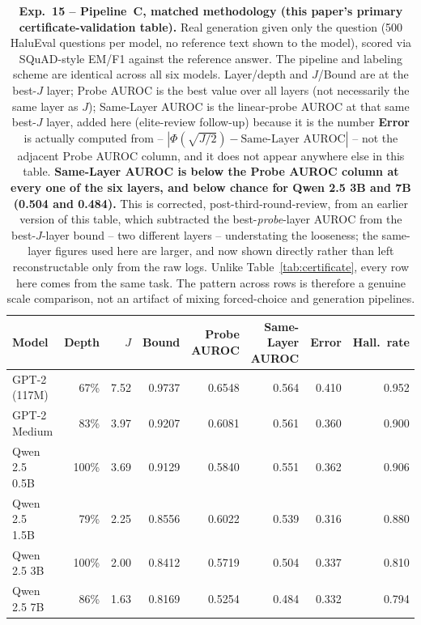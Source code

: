 \documentclass[10pt,twocolumn]{article}
\begin{document}
\begin{table}[!htbp]
\centering
\caption{\textbf{Exp.~15 -- Pipeline~C, matched methodology (this
  paper's primary certificate-validation table).} Real generation given
  only the question (500 HaluEval questions per model, no reference
  text shown to the model), scored via SQuAD-style EM/F1 against the
  reference answer. The pipeline and labeling scheme are identical
  across all six models. Layer/depth and $J$/Bound are at the best-$J$
  layer; Probe AUROC is the best value over all layers (not necessarily
  the same layer as $J$); Same-Layer AUROC is the linear-probe AUROC at
  that same best-$J$ layer, added here (elite-review follow-up) because
  it is the number \textbf{Error} is actually computed from --
  $|\Phi(\sqrt{J/2})-\text{Same-Layer AUROC}|$ -- not the adjacent
  Probe AUROC column, and it does not appear anywhere else in this
  table. \textbf{Same-Layer AUROC is below the Probe AUROC column at
  every one of the six layers, and below chance for Qwen 2.5 3B and
  7B (0.504 and 0.484).} This is corrected, post-third-round-review,
  from an earlier version of this table, which subtracted the
  best-\emph{probe}-layer AUROC from the best-$J$-layer bound -- two
  different layers -- understating the looseness; the same-layer
  figures used here are larger, and now shown directly rather than left
  reconstructable only from the raw logs. Unlike
  Table~\ref{tab:certificate}, every row here comes from the same task.
  The pattern across rows is therefore a genuine scale comparison, not
  an artifact of mixing forced-choice and generation pipelines.}
\label{tab:certificate-matched}
\small
\setlength{\tabcolsep}{3pt}
\begin{tabular}{lrrrrrrr}
\toprule
\textbf{Model} & \textbf{Depth} & $J$ & \textbf{Bound} & \textbf{Probe AUROC} & \textbf{Same-Layer AUROC} & \textbf{Error} & \textbf{Hall.\ rate} \\
\midrule
GPT-2 (117M)   & 67\% & 7.52 & 0.9737 & 0.6548 & 0.564 & 0.410 & 0.952 \\
GPT-2 Medium   & 83\% & 3.97 & 0.9207 & 0.6081 & 0.561 & 0.360 & 0.900 \\
Qwen 2.5 0.5B  & 100\% & 3.69 & 0.9129 & 0.5840 & 0.551 & 0.362 & 0.906 \\
Qwen 2.5 1.5B  & 79\% & 2.25 & 0.8556 & 0.6022 & 0.539 & 0.316 & 0.880 \\
Qwen 2.5 3B    & 100\% & 2.00 & 0.8412 & 0.5719 & 0.504 & 0.337 & 0.810 \\
Qwen 2.5 7B    & 86\% & 1.63 & 0.8169 & 0.5254 & 0.484 & 0.332 & 0.794 \\
\bottomrule
\end{tabular}
\end{table}
\end{document}

